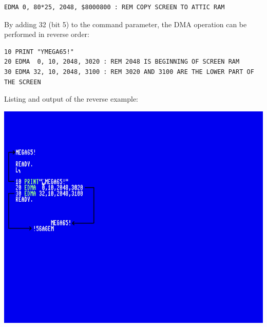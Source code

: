 \begin{description}[leftmargin=2cm,style=nextline]
\begin{tcolorbox}[colback=black,coltext=white]
\begin{verbatim}
EDMA 0, 80*25, 2048, $8000800 : REM COPY SCREEN TO ATTIC RAM
\end{verbatim}
\end{tcolorbox}

                  By adding 32 (bit 5) to the command parameter, the DMA operation can be performed in reverse order:

\begin{tcolorbox}[colback=black,coltext=white]
\verbatimfont{\codefont}
\begin{verbatim}
10 PRINT "ƳMEGA65!"
20 EDMA  0, 10, 2048, 3020 : REM 2048 IS BEGINNING OF SCREEN RAM
30 EDMA 32, 10, 2048, 3100 : REM 3020 AND 3100 ARE THE LOWER PART OF THE SCREEN
\end{verbatim}
\end{tcolorbox}
\clearpage

                  Listing and output of the reverse example:

\item \begin{center}\includegraphics[width=\linewidth]{images/basic-example-edma.png}\end{center}
\end{description}


\newpage
